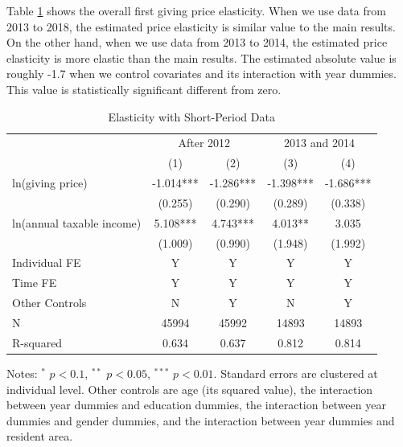 \documentclass[ review  , 3p ]{elsarticle}
\begin{document}
  Table \ref{tab:kableShortElasticity1} shows the overall first giving price elasticity.
  When we use data from 2013 to 2018, the estimated price elasticity is similar value to the main results.
  On the other hand,
  when we use data from 2013 to 2014, the estimated price elasticity is more elastic than the main results.
  The estimated absolute value is roughly -1.7 when we control covariates and its interaction with year dummies.
  This value is statistically significant different from zero.

  \begin{table}

  \caption{\label{tab:kableShortElasticity1}Elasticity with Short-Period Data}
  \centering
  \fontsize{7}{9}\selectfont
  \begin{threeparttable}
  \begin{tabular}[t]{lcccc}
  \toprule
  \multicolumn{1}{c}{ } & \multicolumn{2}{c}{After 2012} & \multicolumn{2}{c}{2013 and 2014} \\
  \cmidrule(l{3pt}r{3pt}){2-3} \cmidrule(l{3pt}r{3pt}){4-5}
   & (1) & (2) & (3) & (4)\\
  \midrule
  ln(giving price) & -1.014*** & -1.286*** & -1.398*** & -1.686***\\
   & (0.255) & (0.290) & (0.289) & (0.338)\\
  ln(annual taxable income) & 5.108*** & 4.743*** & 4.013** & 3.035\\
   & (1.009) & (0.990) & (1.948) & (1.992)\\
  Individual FE & Y & Y & Y & Y\\
  Time FE & Y & Y & Y & Y\\
  Other Controls & N & Y & N & Y\\
  N & 45994 & 45992 & 14893 & 14893\\
  R-squared & 0.634 & 0.637 & 0.812 & 0.814\\
  \bottomrule
  \end{tabular}
  \begin{tablenotes}
  \item Notes: $^{*}$ $p < 0.1$, $^{**}$ $p < 0.05$, $^{***}$ $p < 0.01$. Standard errors are clustered at individual level. Other controls are age (its squared value), the interaction between year dummies and education dummies, the interaction between year dummies and gender dummies, and the interaction between year dummies and resident area.
  \end{tablenotes}
  \end{threeparttable}
  \end{table}
\end{document}
